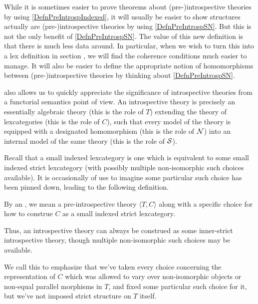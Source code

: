 While it is sometimes easier to prove theorems about (pre-)introspective theories by using \cref{DefnPreIntrospIndexed}, it will usually be easier to show structures actually are (pre-)introspective theories by using \cref{DefnPreIntrospSN}. But this is not the only benefit of \cref{DefnPreIntrospSN}. The value of this new definition is that there is much less data around. In particular, when we wish to turn this into a lex definition in section \TODO, we will find the coherence conditions much easier to manage. It will also be easier to define the appropriate notion of homomorphisms between (pre-)introspective theories by thinking about \cref{DefnPreIntrospSN}.

 also allows us to quickly appreciate the significance of introspective theories from a functorial semantics point of view. An introspective theory is precisely an essentially algebraic theory (this is the role of $T$) extending the theory of lexcategories (this is the role of $C$), such that every model of the theory is equipped with a designated homomorphism (this is the role of $\mathcal{N}$) into an internal model of the same theory (this is the role of $\mathcal{S}$).

Recall that a small indexed lexcategory is one which is equivalent to some small indexed strict lexcategory (with possibly multiple non-isomorphic such choices available). It is occasionally of use to imagine some particular such choice has been pinned down, leading to the following definition.

\begin{definition}
By an , we mean a pre-introspective theory $\langle T, C\rangle$ along with a specific choice for how to construe $C$ as a small indexed strict lexcategory.
\end{definition}

Thus, an introspective theory can always be construed as some inner-strict introspective theory, though multiple non-isomorphic such choices may be available.

We call this  to emphasize that we've taken every choice concerning the representation of $C$ which was allowed to vary over non-isomorphic objects or non-equal parallel morphisms in $T$, and fixed some particular such choice for it, but we've not imposed strict structure on $T$ itself.

